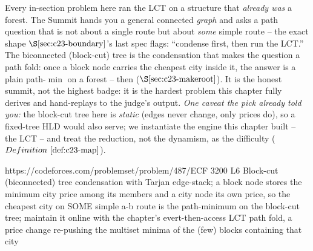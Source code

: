 
\begin{notebox}
Every in-section problem here ran the LCT on a structure that \emph{already was} a forest. The
Summit hands you a general connected \emph{graph} and asks a path question that is not about a
single route but about \emph{some} simple route -- the exact shape \(\secref{c23-boundary}\)'s last
spec flags: ``condense first, then run the LCT.'' The biconnected (block-cut) tree is the condensation
that makes the question a path fold: once a block node carries the cheapest city inside it, the answer
is a plain path-\(\min\) on a forest --  then  (\(\secref{c23-makeroot}\)).
It is the honest summit, not the highest badge: it is the hardest problem this chapter fully derives
and hand-replays to the judge's output. \emph{One caveat the pick already told you:} the block-cut
tree here is \emph{static} (edges never change, only prices do), so a fixed-tree HLD would also serve;
we instantiate the engine this chapter built -- the LCT -- and treat the reduction, not the dynamism,
as the difficulty (\(\defref{c23-map}\)).
\end{notebox}

  {https://codeforces.com/problemset/problem/487/E}{CF 3200 L6}
  {Block-cut (biconnected) tree condensation with Tarjan edge-stack; a block node stores the minimum city price among its members and a city node its own price, so the cheapest city on SOME simple a-b route is the path-minimum on the block-cut tree; maintain it online with the chapter's evert-then-access LCT path fold, a price change re-pushing the multiset minima of the (few) blocks containing that city}

